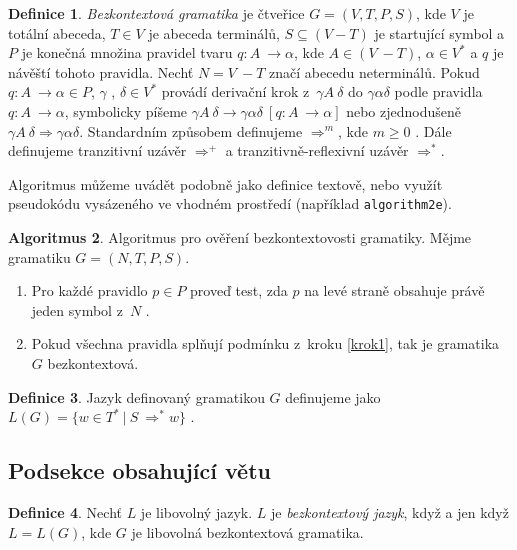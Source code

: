 \documentclass[a4paper, 11pt]{article}
\theoremstyle{definition} %
\newtheorem{definice}{Definice}[section] %
\newtheorem{algoritmus}[definice]{Algoritmus}
\begin{document}
\begin{definice}
\label{definice1.1}
\emph{Bezkontextová gramatika} je čtveřice $G=(V,T,P,S)$, kde $V$ je totální abeceda, $T \in V$ je abeceda terminálů, $S \subseteq (V-T)$ je startující symbol a $P$ je konečná množina pravidel tvaru $q\colon A~\rightarrow \alpha$, kde $A \in (V~- T) $, $\alpha \in V^*$ a $q$ je návěští tohoto pravidla. Nechť $N = V~- T$ značí abecedu neterminálů.
Pokud $q\colon A~\rightarrow \alpha \in P$, $\gamma$ , $\delta \in V^*$ provádí derivační krok z~$\gamma A~\delta$ do $\gamma \alpha \delta$ podle pravidla $q\colon A~\rightarrow \alpha$, symbolicky píšeme 
$\gamma A~\delta \rightarrow \gamma \alpha \delta \ [q\colon A~\rightarrow \alpha]$ nebo zjednodušeně $\gamma A~\delta \Rightarrow \gamma \alpha \delta$. Standardním způsobem definujeme $\Rightarrow^m$, kde $m \geq 0 $ . Dále definujeme 
tranzitivní uzávěr $\Rightarrow^+$ a tranzitivně-reflexivní uzávěr $\Rightarrow^*$.
\end{definice}

Algoritmus můžeme uvádět podobně jako definice textově, nebo využít pseudokódu vysázeného ve vhodném prostředí (například \texttt{algorithm2e}).

\begin{algoritmus}
Algoritmus pro ověření bezkontextovosti gramatiky. Mějme gramatiku $G = (N, T, P, S)$.
\begin{enumerate}
\item \label{krok1} Pro každé pravidlo $p \in P$ proveď test, zda $p$ na levé straně obsahuje právě jeden symbol z~$N$ .
\item Pokud všechna pravidla splňují podmínku z~kroku \ref{krok1}, tak je gramatika $G$ bezkontextová.
\end{enumerate}
\end{algoritmus}

\begin{definice}
Jazyk definovaný gramatikou $G$ definujeme jako $L(G) = \{w \in T^*\ |\ S~\Rightarrow^* w \} $ .
\end{definice}

\subsection{Podsekce obsahující větu}

\begin{definice}
Nechť $L$ je libovolný jazyk. $L$ je \textit{bezkontextový jazyk}, když a jen když $L = L(G)$, kde $G$ je libovolná bezkontextová gramatika.
\end{definice}
\end{document}
